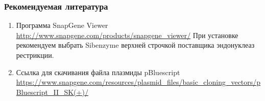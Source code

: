 \subsubsection*{Рекомендуемая литература}

\begin{enumerate}
    \item Программа SnapGene Viewer \url{http://www.snapgene.com/products/snapgene_viewer/} При установке рекомендуем выбрать Sibenzyme верхней строчкой поставщика эндонуклеаз рестрикции. 
    \item Ссылка для скачивания файла плазмиды pBluescript\\ \url{https://www.snapgene.com/resources/plasmid_files/basic_cloning_vectors/pBluescript_II_SK(+)/}
\end{enumerate}